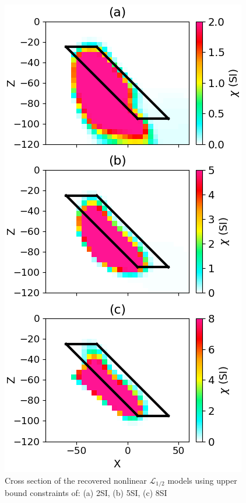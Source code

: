 \begin{figure}[htb]
    \vspace{-0.1cm}
    \begin{center}
    \includegraphics[width=\columnwidth]{figures/LpBound.png}
    \end{center}
    \vspace{-0.5cm}
\caption{
    Cross section of the recovered nonlinear $\mathcal{L}_{1/2}$ models using upper bound constraints of: (a) 2SI, (b) 5SI, (c) 8SI
}
\label{fig:Lp5bound}
\vspace{-0.1cm}
\end{figure}
